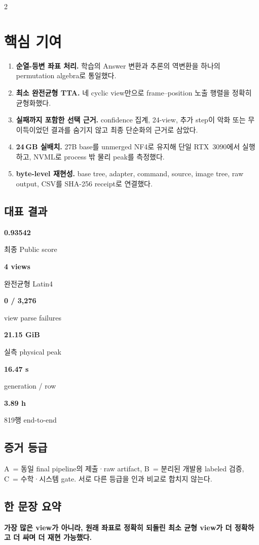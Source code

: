 \documentclass[9pt,a4paper]{extarticle}
\newcommand{\metric}[2]{%
  \begin{minipage}[t]{0.48\linewidth}
    {\sffamily\bfseries\large #1}\par
    {\scriptsize #2}
  \end{minipage}}
\newcommand{\tightnote}[1]{{\scriptsize #1}}
\newcommand{\evidA}{\textsf{\scriptsize A}}
\newcommand{\evidB}{\textsf{\scriptsize B}}
\newcommand{\evidC}{\textsf{\scriptsize C}}
\begin{document}
\begin{multicols}{2}
\columnbreak
\section{핵심 기여}

\begin{enumerate}
\item \textbf{순열-등변 좌표 처리.}
학습의 Answer 변환과 추론의 역변환을 하나의 permutation algebra로 통일했다.
\item \textbf{최소 완전균형 TTA.}
네 cyclic view만으로 frame--position 노출 행렬을 정확히 균형화했다.
\item \textbf{실패까지 포함한 선택 근거.}
confidence 집계, 24-view, 추가 step이 악화 또는 무이득이었던 결과를 숨기지 않고
최종 단순화의 근거로 삼았다.
\item \textbf{24\,GB 실배치.}
27B base를 unmerged NF4로 유지해 단일 RTX~3090에서 실행하고, NVML로
process 밖 물리 peak를 측정했다.
\item \textbf{byte-level 재현성.}
base tree, adapter, command, source, image tree, raw output, CSV를 SHA-256
receipt로 연결했다.
\end{enumerate}

\subsection*{대표 결과}
\vspace{1pt}
\noindent
\metric{0.93542}{최종 Public score}\hfill
\metric{4 views}{완전균형 Latin4}\par\vspace{4pt}
\metric{0 / 3,276}{view parse failures}\hfill
\metric{21.15 GiB}{실측 physical peak}\par\vspace{4pt}
\metric{16.47 s}{generation / row}\hfill
\metric{3.89 h}{819행 end-to-end}

\subsection*{증거 등급}
\tightnote{\evidA\ = 동일 final pipeline의 제출·raw artifact,\quad
\evidB\ = 분리된 개발용 labeled 검증,\quad
\evidC\ = 수학·시스템 gate. 서로 다른 등급을 인과 비교로 합치지 않는다.}

\subsection*{한 문장 요약}
\textbf{가장 많은 view가 아니라, 원래 좌표로 정확히 되돌린 최소 균형 view가
더 정확하고 더 싸며 더 재현 가능했다.}


\end{multicols}
\end{document}
